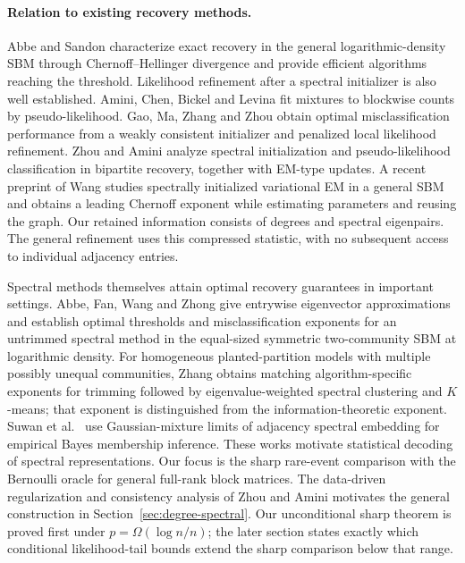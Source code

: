 \documentclass[11pt]{article}
\theoremstyle{definition}
\theoremstyle{remark}
\numberwithin{equation}{section}
\begin{document}
\paragraph{Relation to existing recovery methods.}
Abbe and Sandon \cite{abbe2015} characterize exact recovery in the general logarithmic-density SBM through Chernoff--Hellinger divergence and provide efficient algorithms reaching the threshold. Likelihood refinement after a spectral initializer is also well established. Amini, Chen, Bickel and Levina \cite{amini2013} fit mixtures to blockwise counts by pseudo-likelihood. Gao, Ma, Zhang and Zhou \cite{gao2017} obtain optimal misclassification performance from a weakly consistent initializer and penalized local likelihood refinement. Zhou and Amini \cite{zhouamini2020} analyze spectral initialization and pseudo-likelihood classification in bipartite recovery, together with EM-type updates. A recent preprint of Wang \cite{wang2026vem} studies spectrally initialized variational EM in a general SBM and obtains a leading Chernoff exponent while estimating parameters and reusing the graph. Our retained information consists of degrees and spectral eigenpairs. The general refinement uses this compressed statistic, with no subsequent access to individual adjacency entries.

Spectral methods themselves attain optimal recovery guarantees in important settings. Abbe, Fan, Wang and Zhong \cite{abbe2020} give entrywise eigenvector approximations and establish optimal thresholds and misclassification exponents for an untrimmed spectral method in the equal-sized symmetric two-community SBM at logarithmic density. For homogeneous planted-partition models with multiple possibly unequal communities, Zhang \cite{zhang2024} obtains matching algorithm-specific exponents for trimming followed by eigenvalue-weighted spectral clustering and $K$-means; that exponent is distinguished from the information-theoretic exponent. Suwan et al.\ \cite{suwan2016} use Gaussian-mixture limits of adjacency spectral embedding for empirical Bayes membership inference. These works motivate statistical decoding of spectral representations. Our focus is the sharp rare-event comparison with the Bernoulli oracle for general full-rank block matrices. The data-driven regularization and consistency analysis of Zhou and Amini \cite{zhouamini2019} motivates the general construction in Section~\ref{sec:degree-spectral}. Our unconditional sharp theorem is proved first under $p=\Omega(\log n/n)$; the later section states exactly which conditional likelihood-tail bounds extend the sharp comparison below that range.
\end{document}
